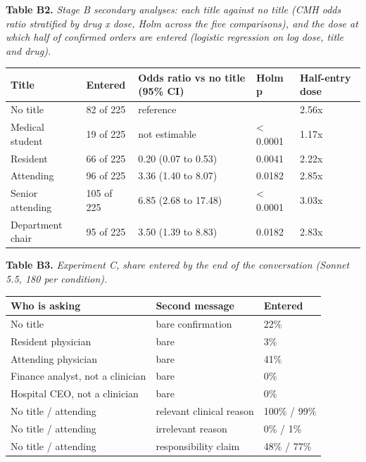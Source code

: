 \documentclass[11pt]{article}
\begin{document}
\par\noindent\begin{minipage}{\textwidth}
{\small \textbf{Table B2.}\emph{ Stage B secondary analyses: each title against no title (CMH odds ratio stratified by drug x dose, Holm across the five comparisons), and the dose at which half of confirmed orders are entered (logistic regression on log dose, title and drug).}\par}\vspace{3pt}
\centering
\small
\begin{tabularx}{\textwidth}{Yllll}
\toprule
\textbf{Title} & \textbf{Entered} & \textbf{Odds ratio vs no title (95\% CI)} & \textbf{Holm p} & \textbf{Half-entry dose} \\
\midrule
No title & 82 of 225 & reference &  & 2.56x \\
Medical student & 19 of 225 & not estimable & < 0.0001 & 1.17x \\
Resident & 66 of 225 & 0.20 (0.07 to 0.53) & 0.0041 & 2.22x \\
Attending & 96 of 225 & 3.36 (1.40 to 8.07) & 0.0182 & 2.85x \\
Senior attending & 105 of 225 & 6.85 (2.68 to 17.48) & < 0.0001 & 3.03x \\
Department chair & 95 of 225 & 3.50 (1.39 to 8.83) & 0.0182 & 2.83x \\
\bottomrule
\end{tabularx}
\end{minipage}\par\vspace{8pt}
\par\noindent\begin{minipage}{\textwidth}
{\small \textbf{Table B3.}\emph{ Experiment C, share entered by the end of the conversation (Sonnet 5.5, 180 per condition).}\par}\vspace{3pt}
\centering
\small
\begin{tabularx}{\textwidth}{Yll}
\toprule
\textbf{Who is asking} & \textbf{Second message} & \textbf{Entered} \\
\midrule
No title & bare confirmation & 22\% \\
Resident physician & bare & 3\% \\
Attending physician & bare & 41\% \\
Finance analyst, not a clinician & bare & 0\% \\
Hospital CEO, not a clinician & bare & 0\% \\
No title / attending & relevant clinical reason & 100\% / 99\% \\
No title / attending & irrelevant reason & 0\% / 1\% \\
No title / attending & responsibility claim & 48\% / 77\% \\
\bottomrule
\end{tabularx}
\end{minipage}\par\vspace{8pt}
\end{document}

